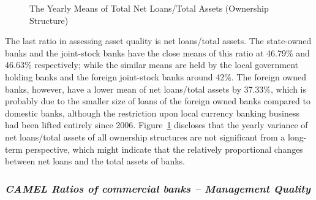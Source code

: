 \documentclass[
  12pt,
  a4paper,
]{scrreprt}
\begin{document}
{{{{\begin{figure}
{}

\caption{\label{fig-NLtoTA}The Yearly Means of Total Net Loans/Total
Assets (Ownership Structure)}

\end{figure}%

The last ratio in assessing asset quality is net loans/total assets. The
state-owned banks and the joint-stock banks have the close means of this
ratio at 46.79\% and 46.63\% respectively; while the similar means are
held by the local government holding banks and the foreign joint-stock
banks around 42\%. The foreign owned banks, however, have a lower mean
of net loans/total assets by 37.33\%, which is probably due to the
smaller size of loans of the foreign owned banks compared to domestic
banks, although the restriction upon local currency banking business had
been lifted entirely since 2006. Figure~\ref{fig-NLtoTA} discloses that
the yearly variance of net loans/total assets of all ownership
structures are not significant from a long-term perspective, which might
indicate that the relatively proportional changes between net loans and
the total assets of banks.

\subsubsection{\texorpdfstring{\emph{CAMEL Ratios of commercial banks --
Management
Quality}}{CAMEL Ratios of commercial banks -- Management Quality}}\label{camel-ratios-of-commercial-banks-management-quality}

\begin{figure}

\end{figure}}}}}
\end{document}
